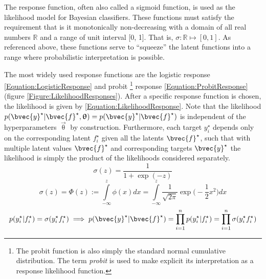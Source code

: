 				The response function, often also called a sigmoid function, is used as the likelihood model for Bayesian classifiers. These functions must satisfy the requirement that is it monotonically non-decreasing with a domain of all real numbers $\mathbb{R}$ and a range of unit interval [0, 1]. That is, $\sigma: \mathbb{R} \mapsto [0, 1]$. As referenced above, these functions serve to ``squeeze'' the latent functions into a range where probabilistic interpretation is possible.
					
				The most widely used response functions are the logistic response \eqref{Equation:LogisticResponse} and probit \footnote{The probit function is also simply the standard normal cumulative distribution. The term \textit{probit} is used to make explicit its interpretation as a response likelihood function.} response \eqref{Equation:ProbitResponse} (figure \ref{Figure:LikelihoodResponses}). After a specific response function is chosen, the likelihood is given by \eqref{Equation:LikelihoodResponse}. Note that the likelihood $p(\bvec{y}^{\star} | \bvec{f}^{\star}, \vec{\uptheta}) = p(\bvec{y}^{\star} | \bvec{f}^{\star})$ is independent of the hyperparameters $\vec{\uptheta}$ by construction. Furthermore, each target $y^{\star}_{i}$ depends only on the corresponding latent $f^{\star}_{i}$ given all the latents $\bvec{f}^{\star}$, such that with multiple latent values $\bvec{f}^{\star}$ and corresponding targets $\bvec{y}^{\star}$ the likelihood is simply the product of the likelihoods considered separately. \begin{equation}
					\sigma(z) = \frac{1}{1 + \exp(-z)}
				\label{Equation:LogisticResponse}
				\end{equation} \begin{equation}
					\sigma(z) = \Phi(z) := \int\limits_{-\infty}^{z} \phi(x) dx =  \int\limits_{-\infty}^{z} \frac{1}{\sqrt{2 \pi}} \exp\Big(- \frac{1}{2} x^{2}\Big) dx
				\label{Equation:ProbitResponse}
				\end{equation} \begin{equation}
					p(y^{\star}_{i} | f^{\star}_{i}) = \sigma(y^{\star}_{i} f^{\star}_{i}) \implies p(\bvec{y}^{\star} | \bvec{f}^{\star}) = \prod_{i = 1}^{n} p(y^{\star}_{i} | f^{\star}_{i}) = \prod_{i = 1}^{n} \sigma(y^{\star}_{i} f^{\star}_{i})
				\label{Equation:LikelihoodResponse}
				\end{equation}				
				
